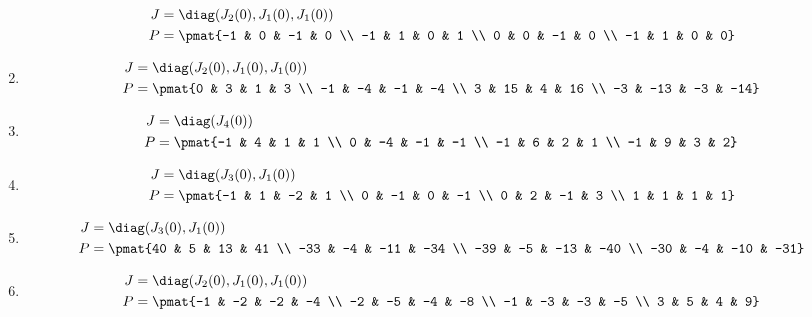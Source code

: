 \begin{enumerate}
\begin{align*}
J &= \diag(J_{2}(0), J_{1}(0), J_{1}(0))\\
P &= \pmat{-1 & 0 & -1 & 0 \\ -1 & 1 & 0 & 1 \\ 0 & 0 & -1 & 0 \\ -1 & 1 & 0 & 0}
\end{align*}

\item

\begin{align*}
J &= \diag(J_{2}(0), J_{1}(0), J_{1}(0))\\
P &= \pmat{0 & 3 & 1 & 3 \\ -1 & -4 & -1 & -4 \\ 3 & 15 & 4 & 16 \\ -3 & -13 & -3 & -14}
\end{align*}

\item

\begin{align*}
J &= \diag(J_{4}(0))\\
P &= \pmat{-1 & 4 & 1 & 1 \\ 0 & -4 & -1 & -1 \\ -1 & 6 & 2 & 1 \\ -1 & 9 & 3 & 2}
\end{align*}

\item

\begin{align*}
J &= \diag(J_{3}(0), J_{1}(0))\\
P &= \pmat{-1 & 1 & -2 & 1 \\ 0 & -1 & 0 & -1 \\ 0 & 2 & -1 & 3 \\ 1 & 1 & 1 & 1}
\end{align*}

\item

\begin{align*}
J &= \diag(J_{3}(0), J_{1}(0))\\
P &= \pmat{40 & 5 & 13 & 41 \\ -33 & -4 & -11 & -34 \\ -39 & -5 & -13 & -40 \\ -30 & -4 & -10 & -31}
\end{align*}

\item

\begin{align*}
J &= \diag(J_{2}(0), J_{1}(0), J_{1}(0))\\
P &= \pmat{-1 & -2 & -2 & -4 \\ -2 & -5 & -4 & -8 \\ -1 & -3 & -3 & -5 \\ 3 & 5 & 4 & 9}
\end{align*}


\end{enumerate}
